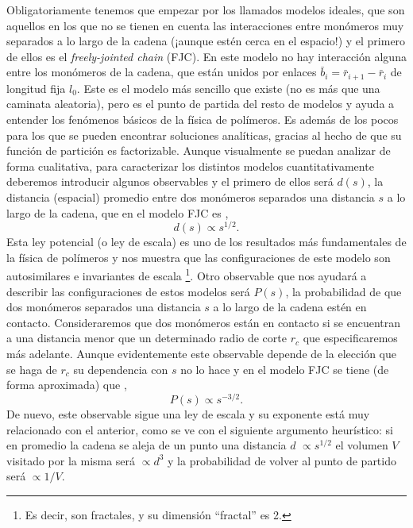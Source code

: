 Obligatoriamente tenemos que empezar por los llamados modelos ideales, que son aquellos en los que no se tienen en cuenta las interacciones entre monómeros muy separados a lo largo de la cadena (¡aunque estén cerca en el espacio!) y el primero de ellos es el \textit{freely-jointed chain} (FJC). En este modelo no hay interacción alguna entre los monómeros de la cadena, que están unidos por enlaces $\bar{b}_i=\bar{r}_{i+1}-\bar{r}_i$ de longitud fija $l_0$. Este es el modelo más sencillo que existe (no es más que una caminata aleatoria), pero es el punto de partida del resto de modelos y ayuda a entender los fenómenos básicos de la física de polímeros. Es además de los pocos para los que se pueden encontrar soluciones analíticas, gracias al hecho de que su función de partición es factorizable. Aunque visualmente se puedan analizar de forma cualitativa, para caracterizar los distintos modelos cuantitativamente deberemos introducir algunos observables y el primero de ellos será $d(s)$, la distancia (espacial) promedio entre dos monómeros separados una distancia $s$ a lo largo de la cadena, que en el modelo FJC es \cite{Theodorakopoulos2019},
\begin{equation}
    \label{eq:FJC_sd}
    d(s)\propto s^{1/2}.
\end{equation}
Esta ley potencial (o ley de escala) es uno de los resultados más fundamentales de la física de polímeros y nos muestra que las configuraciones de este modelo son autosimilares e invariantes de escala \footnote{Es decir, son fractales, y su dimensión ``fractal'' es 2.}. Otro observable que nos ayudará a describir las configuraciones de estos modelos será $P(s)$, la probabilidad de que dos monómeros separados una distancia $s$ a lo largo de la cadena estén en contacto. Consideraremos que dos monómeros están en contacto si se encuentran a una distancia menor que un determinado radio de corte $r_c$ que especificaremos más adelante. Aunque evidentemente este observable depende de la elección que se haga de $r_c$ su dependencia con $s$ no lo hace y en el modelo FJC se tiene (de forma aproximada) que \cite{Kloczkowski1999},
\begin{equation}
    \label{eq:FJC_cp}
    P(s)\propto s^{-3/2}.
\end{equation}
De nuevo, este observable sigue una ley de escala y su exponente está muy relacionado con el anterior, como se ve con el siguiente argumento heurístico: si en promedio la cadena se aleja de un punto una distancia $d$ $\propto s^{1/2}$ el volumen $V$ visitado por la misma será $\propto d^3$ y la probabilidad de volver al punto de partido será $\propto 1/V$.

